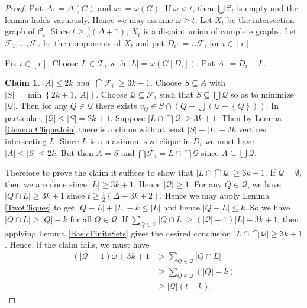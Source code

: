 \documentclass[12pt]{article}
\theoremstyle{plain}
\theoremstyle{definition}
\theoremstyle{remark}
\newcommand{\fancy}[1]{\mathcal{#1}}
\newcommand{\CC}{\fancy{C}}
\newcommand{\set}[1]{\left\{ #1 \right\}}
\newcommand{\card}[1]{\left|#1\right|}
\newcommand{\irange}[1]{\left[#1\right]}
\newcommand{\parens}[1]{\left( #1 \right)}
\newcommand{\DefinedAs}{\mathrel{\mathop:}=}
\begin{document}
\begin{proof}
Put $\Delta \DefinedAs \Delta(G)$ and $\omega \DefinedAs \omega(G)$. If $\omega < t$, then $\bigcup \CC_t$ is empty and the lemma holds vacuously.  Hence we may assume $\omega \geq t$. Let $X_t$ be the intersection graph of $\CC_t$.  Since $t \geq \frac23 (\Delta + 1)$, $X_t$ is a disjoint union of complete graphs.  Let $\fancy{F}_1, \ldots, \fancy{F}_r$ be the components of $X_t$ and put $D_i \DefinedAs \cup \fancy{F}_i$ for $i \in \irange{r}$. 

Fix $i \in \irange{r}$.  Choose $L \in \fancy{F}_i$ with $\card{L} = \omega(G[D_i])$.  Put $A \DefinedAs D_i - L$.  

\textbf{Claim 1.} \textit{$\card{A} \leq 2k$ and $\card{\bigcap \fancy{F}_i} \geq 3k+1$.} Choose $S \subseteq A$ with $\card{S} = \min\set{2k+1, \card{A}}$.  Choose $\fancy{Q} \subseteq \fancy{F}_i$ such that $S \subseteq \bigcup \fancy{Q}$ so as to minimize $\card{\fancy{Q}}$.  Then for any $Q \in \fancy{Q}$ there exists $v_Q \in S \cap \parens{Q - \bigcup \parens{\fancy{Q} - \set{Q}}}$.  In particular, $\card{\fancy{Q}} \leq \card{S} = 2k+1$.  Suppose $\card{L \cap \bigcap \fancy{Q}} \geq 3k+1$.  Then by Lemma \ref{GeneralCliqueJoin} there is a clique with at least $\card{S} + \card{L} - 2k$ vertices intersecting $L$.  Since $L$ is a maximum size clique in $D_i$ we must have $\card{A} \leq \card{S} \leq 2k$.  But then $A = S$ and $\bigcap \fancy{F}_i = L \cap \bigcap \fancy{Q}$ since $A \subseteq \bigcup \fancy{Q}$.

Therefore to prove the claim it suffices to show that $\card{L \cap \bigcap \fancy{Q}} \geq 3k+1$.  If $\fancy{Q} = \emptyset$, then we are done since $\card{L} \geq 3k+1$. Hence $\card{\fancy{Q}} \geq 1$. For any $Q \in \fancy{Q}$, we have $\card{Q \cap L} \geq 3k+1$ since $t \geq \frac12 (\Delta + 3k + 2)$.  Hence we may apply Lemma \ref{TwoCliques} to get $\card{Q-L} + \card{L} - k \leq \card{L}$ and hence $\card{Q-L} \leq k$.  So we have $\card{Q\cap L} \geq \card{Q} - k$ for all $Q \in \fancy{Q}$.  If $\sum_{Q \in \fancy{Q}} \card{Q\cap L} \geq (\card{\fancy{Q}} - 1)\card{L} + 3k+1$, then applying Lemma \ref{BasicFiniteSets} gives the desired conclusion $\card{L \cap \bigcap \fancy{Q}} \geq 3k+1$.  Hence, if the claim fails, we must have
\begin{align*}
(\card{\fancy{Q}} - 1)\omega + 3k+1 &> \sum_{Q \in \fancy{Q}} \card{Q\cap L} \\
&\geq \sum_{Q \in \fancy{Q}} \parens{\card{Q} - k} \\
&\geq \card{\fancy{Q}}(t-k).
\end{align*}


\end{proof}
\end{document}
